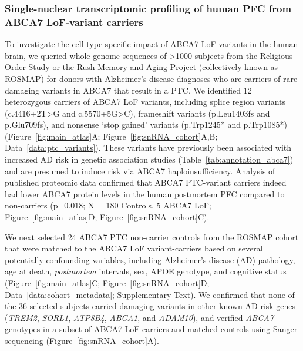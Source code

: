 \subsubsection{Single-nuclear transcriptomic profiling of human PFC from ABCA7 LoF-variant carriers} 
To investigate the cell type-specific impact of ABCA7 LoF variants in the human brain, we queried whole genome sequences of >1000 subjects from the Religious Order Study or the Rush Memory and Aging Project (collectively known as ROSMAP) for donors with Alzheimer’s disease diagnoses who are carriers of rare damaging variants in ABCA7 that result in a PTC. We identified 12 heterozygous carriers of ABCA7 LoF variants, including splice region variants (c.4416+2T>G and c.5570+5G>C), frameshift variants (p.Leu1403fs and p.Glu709fs), and nonsense ‘stop gained’ variants (p.Trp1245* and p.Trp1085*) (Figure~\ref{fig:main_atlas}A; Figure~\ref{fig:snRNA_cohort}A,B; Data~\ref{data:ptc_variants}). These variants have previously been associated with increased AD risk in genetic association studies (Table~\ref{tab:annotation_abca7})\cite{Steinberg2015-mu,Holstege2022-vp} and are presumed to induce risk via ABCA7 haploinsufficiency\cite{Duchateau2024-rf}. Analysis of published proteomic data\cite{Johnson2020-ip} confirmed that ABCA7 PTC-variant carriers indeed had lower ABCA7 protein levels in the human postmortem PFC compared to non-carriers (p=0.018; N = 180 Controls, 5 ABCA7 LoF; Figure~\ref{fig:main_atlas}D; Figure~\ref{fig:snRNA_cohort}C). 

We next selected 24 ABCA7 PTC non-carrier controls from the ROSMAP cohort that were matched to the ABCA7 LoF variant-carriers based on several potentially confounding variables, including Alzheimer's disease (AD) pathology, age at death, \textit{postmortem} intervals, sex, APOE genotype, and cognitive status (Figure~\ref{fig:main_atlas}C; Figure~\ref{fig:snRNA_cohort}D; Data~\ref{data:cohort_metadata}; Supplementary Text). We confirmed that none of the 36 selected subjects carried damaging variants in other known AD risk genes (\textit{TREM2}, \textit{SORL1}, \textit{ATP8B4}, \textit{ABCA1}, and \textit{ADAM10})\cite{Holstege2022-vp}, and verified \textit{ABCA7} genotypes in a subset of ABCA7 LoF carriers and matched controls using Sanger sequencing (Figure~\ref{fig:snRNA_cohort}A).

